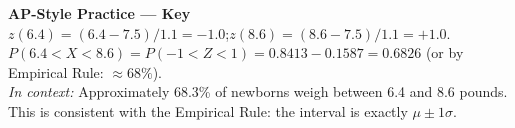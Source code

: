 \documentclass[10pt]{article}
\begin{document}
\vspace{0.16in}

\begin{tcolorbox}[colback=redbg, colframe=redacc, boxrule=0.8pt, arc=2mm,
    left=4mm, right=4mm, top=3mm, bottom=3mm]
\small\textbf{AP-Style Practice — Key}\\[6pt]
$z(6.4) = (6.4-7.5)/1.1 = -1.0$;\quad $z(8.6) = (8.6-7.5)/1.1 = +1.0$.\\
$P(6.4 < X < 8.6) = P(-1 < Z < 1) = 0.8413 - 0.1587 = \mathbf{0.6826}$
(or by Empirical Rule: $\approx 68\%$).\\[4pt]
\textit{In context:} Approximately 68.3\% of newborns weigh between 6.4 and 8.6 pounds.
This is consistent with the Empirical Rule: the interval is exactly $\mu \pm 1\sigma$.
\end{tcolorbox}
\end{document}

